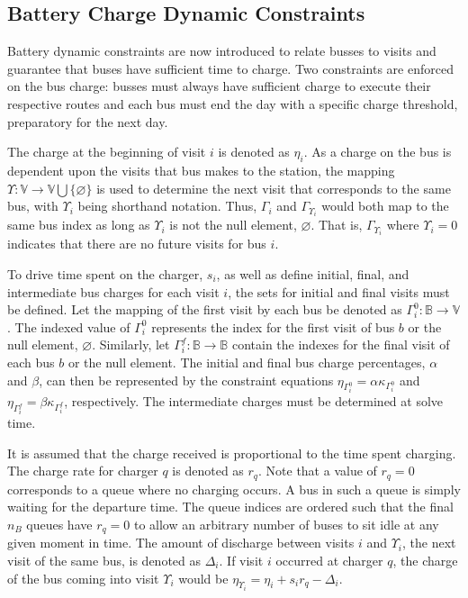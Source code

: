 \documentclass[utf8]{FrontiersinHarvard}
\begin{document}
\subsection{Battery Charge Dynamic Constraints}
\label{sec:batt_dynamics}
Battery dynamic constraints are now introduced to relate busses to visits and guarantee that buses have sufficient time
to charge. Two constraints are enforced on the bus charge: busses must always have sufficient charge to execute their
respective routes and each bus must end the day with a specific charge threshold, preparatory for the next day.

The charge at the beginning of visit \(i\) is denoted as \(\eta_i\). As a charge on the bus is dependent upon the visits that
bus makes to the station, the mapping \(\Upsilon: \mathbb{V} \rightarrow \mathbb{V} \bigcup \{\varnothing\}\) is used to determine the next visit
that corresponds to the same bus, with \(\Upsilon_i\) being shorthand notation. Thus, \(\Gamma_i\) and \(\Gamma_{\Upsilon_i}\) would both map to the
same bus index as long as \(\Upsilon_i\) is not the null element, \(\varnothing\). That is, \(\Gamma_{\Upsilon_i}\) where \(\Upsilon_i = 0\) indicates
that there are no future visits for bus \(i\).

To drive time spent on the charger, \(s_i\), as well as define initial, final, and intermediate bus charges for each visit
\(i\), the sets for initial and final visits must be defined. Let the mapping of the first visit by each bus be denoted as
\(\Gamma^0_i : \mathbb{B} \rightarrow \mathbb{V}\). The indexed value of \(\Gamma^0_i\) represents the index for the first visit of bus \(b\) or
the null element, \(\varnothing\). Similarly, let \(\Gamma^f_i : \mathbb{B} \rightarrow \mathbb{B}\) contain the indexes for the final
visit of each bus \(b\) or the null element. The initial and final bus charge percentages, \(\alpha\) and \(\beta\), can then be
represented by the constraint equations \(\eta_{\Gamma^0_i} = \alpha \kappa_{\Gamma^0_i}\) and \(\eta_{\Gamma^f_i} = \beta \kappa_{\Gamma^f_i}\), respectively. The
intermediate charges must be determined at solve time.

It is assumed that the charge received is proportional to the time spent charging. The charge rate for charger \(q\) is
denoted as \(r_q\). Note that a value of \(r_q = 0\) corresponds to a queue where no charging occurs. A bus in such a queue
is simply waiting for the departure time. The queue indices are ordered such that the final \(n_B\) queues have \(r_q = 0\)
to allow an arbitrary number of buses to sit idle at any given moment in time. The amount of discharge between visits
\(i\) and \(\Upsilon_i\), the next visit of the same bus, is denoted as \(\Delta_i\). If visit \(i\) occurred at charger \(q\), the charge of
the bus coming into visit \(\Upsilon_i\) would be \(\eta_{\Upsilon_i} = \eta_i + s_i r_q - \Delta_i\).
\end{document}
